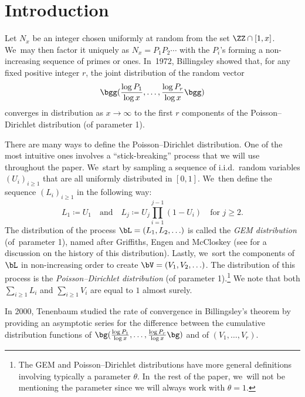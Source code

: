 \section{Introduction}
\label{sec:intro}

Let $N_x$ be an integer chosen uniformly at random from the set $\ZZ \cap [1, x]$. We~may then factor it uniquely as $N_x = P_1P_2 \cdots$ with the $P_i$'s forming a non-increasing sequence of primes or ones. In~1972, Billingsley \cite{Bill72} showed that, for any fixed positive integer $r$, the joint distribution of the random vector
\[
\bgg(\frac{\log P_1}{\log x}, \ldots, \frac{\log P_r}{\log x}\bgg)
\]
converges in distribution as $x \to \infty$ to the first $r$ components of the Poisson--Dirichlet distribution (of parameter 1).

There are many ways to define the Poisson--Dirichlet distribution. One of the most intuitive ones involves a ``stick-breaking'' process that we will use throughout the paper. We~start by sampling a sequence of i.i.d.~random variables $(U_i)_{i \ge 1}$ that are all uniformly distributed in $[0, 1]$. We~then define the sequence $(L_i)_{i \ge 1}$ in the following way:
\[
L_1 \coloneqq U_1 \quad \text{and}\quad L_j \coloneqq U_j \prod_{i=1}^{j-1} (1-U_i) \quad \text{for $j \ge 2$.}
\]
The distribution of the process $\bL = (L_1, L_2, \ldots)$ is called the \textit{GEM distribution} (of~parameter 1), named after Griffiths, Engen and McCloskey (see \cite[Ch.\,41]{JKB} for a discussion on the history of this distribution). Lastly, we~sort the components of $\bL$ in non-increasing order to create $\bV = (V_1, V_2, \ldots)$. The distribution of this process is the \textit{Poisson--Dirichlet distribution} (of parameter 1).\footnote{The GEM and Poisson--Dirichlet distributions have more general definitions involving typically a parameter $\theta$. In~the rest of the paper, we~will not be mentioning the parameter since we will always work with $\theta = 1$.} We note that both $\sum_{i \ge 1} L_i$ and $\sum_{i \ge 1} V_i$ are equal to $1$ almost surely.

In 2000, Tenenbaum \cite{Tenenbaum00} studied the rate of convergence in Billingsley's theorem by providing an asymptotic series for the difference between the cumulative distribution functions of $\bg(\tfrac{\log P_1}{\log x}, \ldots, \tfrac{\log P_r}{\log x}\bg)$ and of $(V_1, \ldots, V_r)$.

